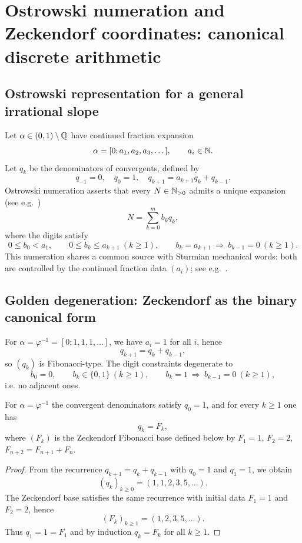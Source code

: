 \section{Ostrowski numeration and Zeckendorf coordinates: canonical discrete arithmetic}
\label{sec:zeckendorf}

\subsection{Ostrowski representation for a general irrational slope}
Let $\alpha\in(0,1)\setminus\mathbb{Q}$ have continued fraction expansion
$$
\alpha=[0;a_1,a_2,a_3,\dots],\qquad a_i\in\mathbb{N}.
$$
Let $q_k$ be the denominators of convergents, defined by
$$
q_{-1}=0,\quad q_0=1,\quad q_{k+1}=a_{k+1}q_k+q_{k-1}.
$$
Ostrowski numeration asserts that every $N\in\mathbb{N}_{>0}$ admits a unique expansion (see e.g.~\cite{AlloucheShallit2003,Lothaire2002})
$$
N=\sum_{k=0}^{m} b_{k} q_k,
$$
where the digits satisfy
\begin{equation}
\label{eq:ostrowski_digits}
0\le b_0<a_1,\qquad
0\le b_{k}\le a_{k+1}\ (k\ge 1),\qquad
b_{k}=a_{k+1}\ \Rightarrow\ b_{k-1}=0\ (k\ge 1).
\end{equation}
This numeration shares a common source with Sturmian mechanical words: both are controlled by the continued fraction data $(a_i)$; see e.g.~\cite{AlloucheShallit2003,Lothaire2002}.

\subsection{Golden degeneration: Zeckendorf as the binary canonical form}
For $\alpha=\varphi^{-1}=[0;1,1,1,\dots]$, we have $a_i=1$ for all $i$, hence
$$
q_{k+1}=q_k+q_{k-1},
$$
so $(q_k)$ is Fibonacci-type. The digit constraints degenerate to
$$
b_0=0,\qquad b_{k}\in\{0,1\}\ (k\ge 1),\qquad b_{k}=1\ \Rightarrow\ b_{k-1}=0\ (k\ge 1),
$$
i.e. no adjacent ones.

\begin{lemma}
\label{lem:qk_fib}
For $\alpha=\varphi^{-1}$ the convergent denominators satisfy $q_0=1$, and for every $k\ge 1$ one has
$$
q_k=F_k,
$$
where $(F_k)$ is the Zeckendorf Fibonacci base defined below by $F_1=1$, $F_2=2$, $F_{n+2}=F_{n+1}+F_n$.
\end{lemma}

\begin{proof}
From the recurrence $q_{k+1}=q_k+q_{k-1}$ with $q_0=1$ and $q_1=1$, we obtain
$$
(q_k)_{k\ge 0}=(1,1,2,3,5,\dots).
$$
The Zeckendorf base satisfies the same recurrence with initial data $F_1=1$ and $F_2=2$, hence
$$
(F_k)_{k\ge 1}=(1,2,3,5,\dots).
$$
Thus $q_1=1=F_1$ and by induction $q_k=F_k$ for all $k\ge 1$.
\end{proof}

